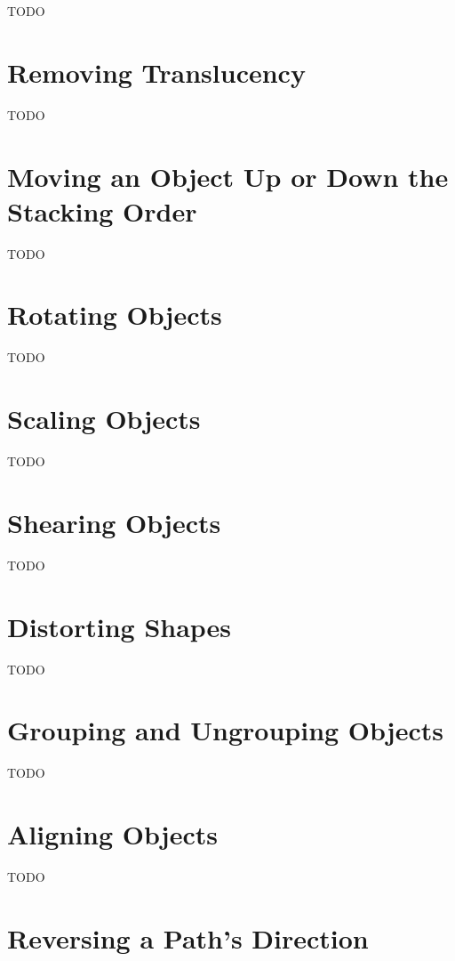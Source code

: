 TODO


\section{Removing Translucency}\label{sec:removetrans}

TODO


\section{Moving an Object Up or Down the Stacking Order}\label{sec:moveupordown}

TODO


\section{Rotating Objects}\label{sec:rotateobjects}

TODO


\section{Scaling Objects}\label{sec:scaleobjects}

TODO


\section{Shearing Objects}\label{sec:shearobjects}

TODO


\section{Distorting Shapes}\label{sec:distort}

TODO


\section{Grouping and Ungrouping Objects}\label{sec:grouping}

TODO


\section{Aligning Objects}\label{sec:alignobjects}

TODO


\section{Reversing a Path's Direction}\label{sec:reversing}

